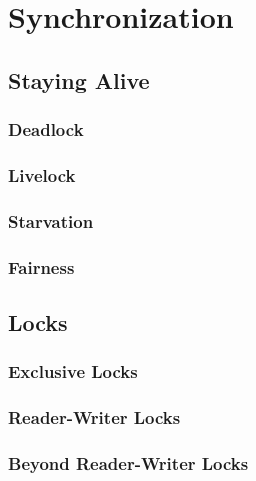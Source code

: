 
\chapter{Synchronization}
\label{chp:Synchronization}

\section{Staying Alive}
\label{sec:sync:Staying Alive}

\subsection{Deadlock}
\label{sec:sync:Deadlock}

\subsection{Livelock}
\label{sec:sync:Livelock}

\subsection{Starvation}
\label{sec:sync:Starvation}

\subsection{Fairness}
\label{sec:sync:Fairness}

\section{Locks}
\label{sec:sync:Locks}

\subsection{Exclusive Locks}
\label{sec:sync:Exclusive Locks}

\subsection{Reader-Writer Locks}
\label{sec:sync:Reader-Writer Locks}

\subsection{Beyond Reader-Writer Locks}
\label{sec:sync:Beyond Reader-Writer Locks}

